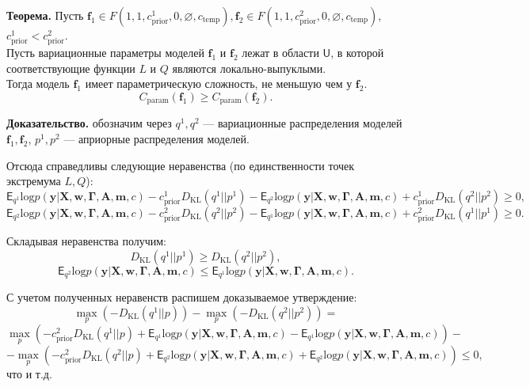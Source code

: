 \textbf{Теорема.}  
Пусть $\mathbf{f}_1 \in F(1, 1, c_{\text{prior}}^1, 0, \varnothing,  c_{\text{temp}} ), \mathbf{f}_2 \in F(1, 1, c_{\text{prior}}^2, 0, \varnothing,  c_{\text{temp}})$, $c_{\text{prior}}^1 < c_{\text{prior}}^2$.\\
Пусть вариационные параметры моделей $\mathbf{f}_1$ и $\mathbf{f}_2$ лежат в области $\mathsf{U}$, в которой соответствующие функции $L$ и $Q$ являются локально-выпуклыми.\\ 
Тогда модель $\mathbf{f}_1$ имеет параметрическую сложность, не меньшую чем у $\mathbf{f}_2$.
\[
    C_\text{param}(\mathbf{f}_1) \geq C_\text{param}(\mathbf{f}_2).
\]

\textbf{Доказательство.}
обозначим через $q^1, q^2$ --- вариационные распределения моделей $\mathbf{f}_1, \mathbf{f}_2$, 
$p^1, p^2$ --- априорные распределения моделей.
 
 Отсюда справедливы следующие неравенства (по единственности точек экстремума $L,Q$):
\[
    \mathsf{E}_{q^1}\text{log} p(\mathbf{y}|\mathbf{X},\mathbf{w}, \boldsymbol{\Gamma}, \mathbf{A},\mathbf{m}, c) - c_{\text{prior}}^1  D_\text{KL}(q^1||p^1)  -  \mathsf{E}_{q^2}\text{log} p(\mathbf{y}|\mathbf{X},\mathbf{w}, \boldsymbol{\Gamma}, \mathbf{A},\mathbf{m}, c) + c_{\text{prior}}^1  D_\text{KL}(q^2||p^2) \geq 0,
\]
\[
    \mathsf{E}_{q^2}\text{log} p(\mathbf{y}|\mathbf{X},\mathbf{w}, \boldsymbol{\Gamma}, \mathbf{A},\mathbf{m}, c) - c_{\text{prior}}^2  D_\text{KL}(q^2||p^2)  -  \mathsf{E}_{q^1}\text{log} p(\mathbf{y}|\mathbf{X},\mathbf{w}, \boldsymbol{\Gamma}, \mathbf{A},\mathbf{m}, c) + c_{\text{prior}}^2  D_\text{KL}(q^1||p^1) \geq 0.
\]

Складывая неравенства получим:
\[
    D_\text{KL}(q^1||p^1) \geq D_\text{KL}(q^2||p^2),
\]
\[
    \mathsf{E}_{q^2}\text{log} p(\mathbf{y}|\mathbf{X},\mathbf{w}, \boldsymbol{\Gamma}, \mathbf{A},\mathbf{m}, c)  \leq \mathsf{E}_{q^1}\text{log} p(\mathbf{y}|\mathbf{X},\mathbf{w}, \boldsymbol{\Gamma}, \mathbf{A},\mathbf{m}, c) .
\]

С учетом полученных неравенств распишем доказываемое утверждение:
\[
    \max_p \left(-D_\text{KL}(q^1||p)\right) - \max_{p} \left(-D_\text{KL}(q^2||p^2)\right) = 
\]
\[ \max_p  \left(-c_{\text{prior}}^2 D_\text{KL}(q^1||p) +\mathsf{E}_{q^1}\text{log} p(\mathbf{y}|\mathbf{X},\mathbf{w}, \boldsymbol{\Gamma}, \mathbf{A},\mathbf{m}, c) - \mathsf{E}_{q^1}\text{log} p(\mathbf{y}|\mathbf{X},\mathbf{w}, \boldsymbol{\Gamma}, \mathbf{A},\mathbf{m}, c) \right) -
\]
\[  - \max_{p} \left(-c_{\text{prior}}^2 D_\text{KL}(q^2||p)  + \mathsf{E}_{q^2}\text{log} p(\mathbf{y}|\mathbf{X},\mathbf{w}, \boldsymbol{\Gamma}, \mathbf{A},\mathbf{m}, c) +\mathsf{E}_{q^2}\text{log} p(\mathbf{y}|\mathbf{X},\mathbf{w}, \boldsymbol{\Gamma}, \mathbf{A},\mathbf{m}, c)  \right)    \leq 0,  
\]
что и т.д.
\clearpage

